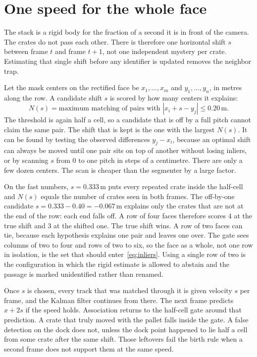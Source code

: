 \documentclass[11pt,a4paper]{article}
\begin{document}
\section{One speed for the whole face}
\label{sec:rigid}

The stack is a rigid body for the fraction of a second it is in front of the camera. The crates do not pass each other. There is therefore one horizontal shift $s$ between frame $t$ and frame $t+1$, not one independent mystery per crate. Estimating that single shift before any identifier is updated removes the neighbor trap.

Let the mask centers on the rectified face be $x_1,\ldots,x_m$ and $y_1,\ldots,y_n$, in metres along the row. A candidate shift $s$ is scored by how many centers it explains:
\begin{equation}
N(s) = \text{maximum matching of pairs with } |x_i + s - y_j| \le 0.20\,\mathrm{m}.
\label{eq:inliers}
\end{equation}
The threshold is again half a cell, so a candidate that is off by a full pitch cannot claim the same pair. The shift that is kept is the one with the largest $N(s)$. It can be found by testing the observed differences $y_j-x_i$, because an optimal shift can always be moved until one pair sits on top of another without losing inliers, or by scanning $s$ from $0$ to one pitch in steps of a centimetre. There are only a few dozen centers. The scan is cheaper than the segmenter by a large factor.

On the fast numbers, $s=0.333\,\mathrm{m}$ puts every repeated crate inside the half-cell and $N(s)$ equals the number of crates seen in both frames. The off-by-one candidate $s=0.333-0.40=-0.067\,\mathrm{m}$ explains only the crates that are not at the end of the row: each end falls off. A row of four faces therefore scores $4$ at the true shift and $3$ at the shifted one. The true shift wins. A row of two faces can tie, because each hypothesis explains one pair and leaves one over. The gate sees columns of two to four and rows of two to six, so the face as a whole, not one row in isolation, is the set that should enter~\eqref{eq:inliers}. Using a single row of two is the configuration in which the rigid estimate is allowed to abstain and the passage is marked unidentified rather than renamed.

Once $s$ is chosen, every track that was matched through it is given velocity $s$ per frame, and the Kalman filter continues from there. The next frame predicts $x+2s$ if the speed holds. Association returns to the half-cell gate around that prediction. A crate that truly moved with the pallet falls inside the gate. A false detection on the dock does not, unless the dock point happened to lie half a cell from some crate after the same shift. Those leftovers fail the birth rule when a second frame does not support them at the same speed.
\end{document}
